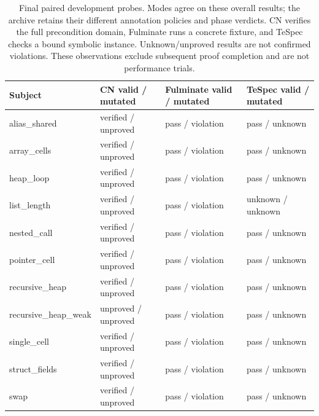 \begin{table}[t]
\centering
\small
\begin{tabular}{llll}
\toprule
Subject & CN valid / mutated & Fulminate valid / mutated & TeSpec valid / mutated \\
\midrule
alias\_shared & verified / unproved & pass / violation & pass / unknown \\
array\_cells & verified / unproved & pass / violation & pass / unknown \\
heap\_loop & verified / unproved & pass / violation & pass / unknown \\
list\_length & verified / unproved & pass / violation & unknown / unknown \\
nested\_call & verified / unproved & pass / violation & pass / unknown \\
pointer\_cell & verified / unproved & pass / violation & pass / unknown \\
recursive\_heap & verified / unproved & pass / violation & pass / unknown \\
recursive\_heap\_weak & unproved / unproved & pass / violation & pass / unknown \\
single\_cell & verified / unproved & pass / violation & pass / unknown \\
struct\_fields & verified / unproved & pass / violation & pass / unknown \\
swap & verified / unproved & pass / violation & pass / unknown \\
\bottomrule
\end{tabular}
\caption{Final paired development probes. Modes agree on these overall results; the archive retains their different annotation policies and phase verdicts. CN verifies the full precondition domain, Fulminate runs a concrete fixture, and TeSpec checks a bound symbolic instance. Unknown/unproved results are not confirmed violations. These observations exclude subsequent proof completion and are not performance trials.}
\label{tab:paired-observations}
\end{table}
